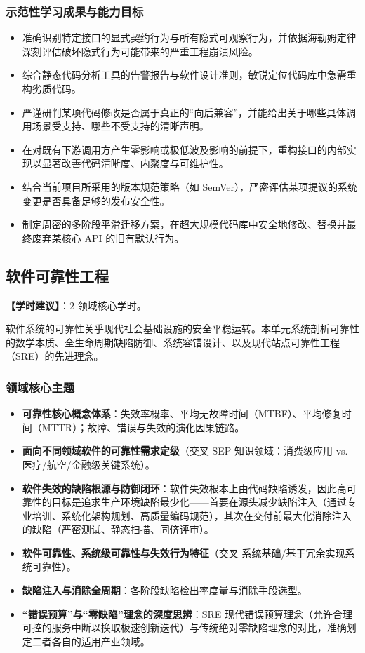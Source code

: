 \subsubsection{示范性学习成果与能力目标}
\begin{itemize}
    \item 准确识别特定接口的显式契约行为与所有隐式可观察行为，并依据海勒姆定律深刻评估破坏隐式行为可能带来的严重工程崩溃风险。
    \item 综合静态代码分析工具的告警报告与软件设计准则，敏锐定位代码库中急需重构劣质代码。
    \item 严谨研判某项代码修改是否属于真正的“向后兼容”，并能给出关于哪些具体调用场景受支持、哪些不受支持的清晰声明。
    \item 在对既有下游调用方产生零影响或极低波及影响的前提下，重构接口的内部实现以显著改善代码清晰度、内聚度与可维护性。
    \item 结合当前项目所采用的版本规范策略（如 SemVer），严密评估某项提议的系统变更是否具备足够的发布安全性。
    \item 制定周密的多阶段平滑迁移方案，在超大规模代码库中安全地修改、替换并最终废弃某核心 API 的旧有默认行为。
\end{itemize}

\subsection{软件可靠性工程}
\textbf{【学时建议】}：2 领域核心学时。

软件系统的可靠性关乎现代社会基础设施的安全平稳运转。本单元系统剖析可靠性的数学本质、全生命周期缺陷防御、系统容错设计、以及现代站点可靠性工程（SRE）的先进理念。

\subsubsection{领域核心主题}
\begin{itemize}
    \item \textbf{可靠性核心概念体系}：失效率概率、平均无故障时间（MTBF）、平均修复时间（MTTR）；故障、错误与失效的演化因果链路。
    \item \textbf{面向不同领域软件的可靠性需求定级}（交叉 SEP 知识领域：消费级应用 vs. 医疗/航空/金融级关键系统）。
    \item \textbf{软件失效的缺陷根源与防御闭环}：软件失效根本上由代码缺陷诱发，因此高可靠性的目标是追求生产环境缺陷最少化——首要在源头减少缺陷注入（通过专业培训、系统化架构规划、高质量编码规范），其次在交付前最大化消除注入的缺陷（严密测试、静态扫描、同侪评审）。
    \item \textbf{软件可靠性、系统级可靠性与失效行为特征}（交叉 系统基础/基于冗余实现系统可靠性）。
    \item \textbf{缺陷注入与消除全周期}：各阶段缺陷检出率度量与消除手段选型。
    \item \textbf{“错误预算”与“零缺陷”理念的深度思辨}：SRE 现代错误预算理念（允许合理可控的服务中断以换取极速创新迭代）与传统绝对零缺陷理念的对比，准确划定二者各自的适用产业领域。
\end{itemize}

